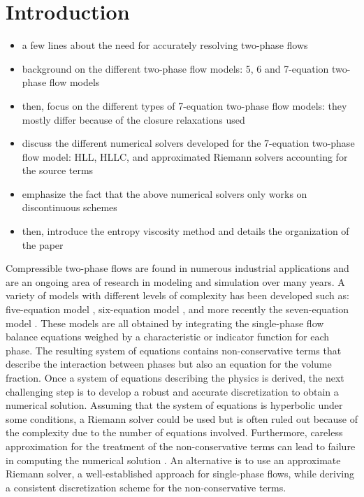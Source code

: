 \documentclass[preprint,10pt]{elsarticle}
\begin{document}
\section{Introduction}\label{sec:intro}
\begin{itemize}
\item a few lines about the need for accurately resolving two-phase flows
\item background on the different two-phase flow models: 5, 6 and 7-equation two-phase flow models
\item then, focus on the different types of 7-equation two-phase flow models: they mostly differ because of the closure relaxations used
\item discuss the different numerical solvers developed for the 7-equation two-phase flow model: HLL, HLLC, and approximated Riemann solvers accounting for the source terms
\item emphasize the fact that the above numerical solvers only works on discontinuous schemes
\item then, introduce the entropy viscosity method and details the organization of the paper 
\end{itemize}
%
Compressible two-phase flows are found in numerous industrial applications and are an ongoing area of research in modeling and simulation over many years. A variety of models with different levels of complexity has been developed such as: five-equation model \cite{Kapila_2001}, six-equation model \cite{Toumi_1996}, and more recently the seven-equation model \cite{SEM}. These models are all obtained by integrating the single-phase flow balance equations weighed by a characteristic or indicator function for each phase. The resulting system of equations contains non-conservative terms that describe the interaction between phases but also an equation for the volume fraction. Once a system of equations describing the physics is derived, the next challenging step is to develop a robust and accurate discretization to obtain a numerical solution. Assuming that the system of equations is hyperbolic under some conditions, a Riemann solver could be used but is often ruled out because of the complexity due to the number of equations involved. Furthermore, careless approximation for the treatment of the non-conservative terms can lead to failure in computing the numerical solution \cite{Abgrall_2002}. An alternative is to use an approximate Riemann solver, a well-established approach for single-phase flows, while deriving a consistent discretization scheme for the non-conservative terms. 
\end{document}

